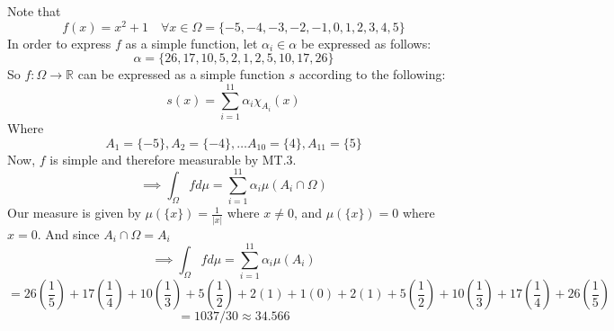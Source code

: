 \documentclass[letterpaper,12pt]{article}
\theoremstyle{definition}
\begin{document}
Note that \[f(x)=x^2+1 \quad  \forall x \in \Omega = \{-5,-4,-3,-2,-1,0,1,2,3,4,5 \}\] In order to express $f$ as a simple function, let $\alpha_i \in \alpha$ be expressed as follows:
\[\alpha=\{26,17,10,5,2,1,2,5,10,17,26\}\]
So $f: \Omega \rightarrow \mathbb{R}$ can be expressed as a simple function $s$ according to the following:
\[s(x)=\sum_{i=1}^{11}\alpha_i \chi_{A_i}(x)\]
Where  \[A_1=\{-5\}, A_2=\{-4\}, \hdots A_{10}=\{4\}, A_{11}=\{5\}\]
Now, $f$ is simple and therefore measurable by MT.3. 
\[\implies \int_\Omega f d\mu=\sum_{i=1}^{11}\alpha_i\mu(A_i \cap \Omega )\] 
Our measure is given by $\mu (\{x\}) = \frac{1}{|x|}$ where $x \neq 0$, and $\mu (\{x\}) = 0$ where $ x = 0$. 
And since $A_i \cap \Omega = A_i$ 
\[\implies  \int_\Omega f d\mu=\sum_{i=1}^{11}\alpha_i\mu(A_i ) \] \[=
26(\frac{1}{5}) + 17(\frac{1}{4}) + 10(\frac{1}{3}) + 5(\frac{1}{2}) + 2(1) + 1(0) + 2(1) + 5(\frac{1}{2}) + 10(\frac{1}{3})+ 17(\frac{1}{4}) +26(\frac{1}{5})\]
\[=1037/30 \approx 34.566\]
\end{document}
